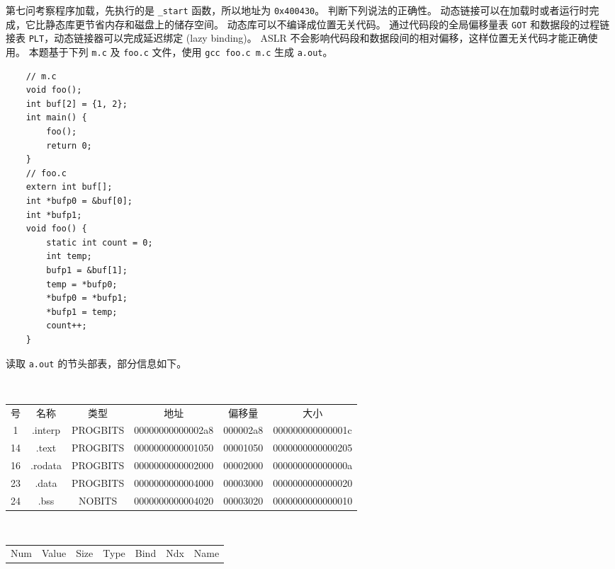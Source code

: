 \begin{problems}
        第七问考察程序加载，先执行的是 \verb|_start| 函数，所以地址为 \verb|0x400430|。
        \pro[origin={丁睿助教提供}] 判断下列说法的正确性。
            \qn 动态链接可以在加载时或者运行时完成，它比静态库更节省内存和磁盘上的储存空间。
            \qn 动态库可以不编译成位置无关代码。
            \qn 通过代码段的全局偏移量表 \verb|GOT| 和数据段的过程链接表 \verb|PLT|，动态链接器可以完成延迟绑定 (lazy binding)。
            \qn ASLR 不会影响代码段和数据段间的相对偏移，这样位置无关代码才能正确使用。
        \pro[origin={丁睿助教提供}] 本题基于下列 \verb|m.c| 及 \verb|foo.c| 文件，使用 \verb|gcc foo.c m.c| 生成 \verb|a.out|。
        \begin{verbatim}
    // m.c
    void foo();
    int buf[2] = {1, 2};
    int main() {
        foo();
        return 0;
    }
    // foo.c
    extern int buf[];
    int *bufp0 = &buf[0];
    int *bufp1;
    void foo() {
        static int count = 0;
        int temp;
        bufp1 = &buf[1];
        temp = *bufp0;
        *bufp0 = *bufp1;
        *bufp1 = temp;
        count++;
    }
        \end{verbatim}
        \qn 读取 \verb|a.out| 的节头部表，部分信息如下。
        \begin{table}[H]
            \tt
            \centering
            \begin{tabular}{|cccccc|}
                \hline
                号 & 名称 & 类型 & 地址 & 偏移量 & 大小 \\
                1 & .interp & PROGBITS & 00000000000002a8 & 000002a8 & 000000000000001c \\
                14 & .text & PROGBITS & 0000000000001050 & 00001050 & 0000000000000205 \\
                16 & .rodata & PROGBITS & 0000000000002000 & 00002000 & 000000000000000a \\
                23 & .data & PROGBITS & 0000000000004000 & 00003000 & 0000000000000020 \\
                24 & .bss & NOBITS & 0000000000004020 & 00003020 & 0000000000000010 \\ \hline
            \end{tabular}
        \end{table}
        \begin{table}[H]
            \tt
            \centering
            \begin{tabular}{ccccccc}
                \hline
                \multicolumn{1}{|c}{Num} & Value & Size & Type & Bind & Ndx & \multicolumn{1}{c|}{Name} \\

\end{tabular}
\end{table}
\end{problems}
